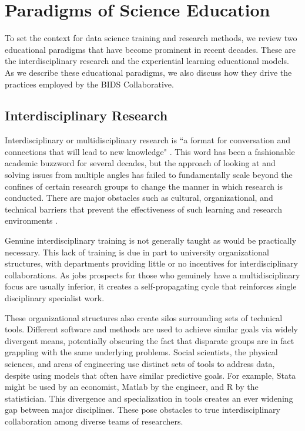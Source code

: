 \documentclass[12pt]{article}
\begin{document}
\section{Paradigms of Science Education}

To set the context for data science training and research methods, we review two educational paradigms that have become prominent in recent decades. These are the interdisciplinary research and the experiential learning educational models.  As we describe these educational paradigms, we also discuss how they drive the practices employed by the BIDS Collaborative.

\subsection{Interdisciplinary Research}

Interdisciplinary or multidisciplinary research is ``a format for conversation and connections that will lead to new knowledge" \citep{repko2008interdisciplinary}. This word has been a fashionable academic buzzword for several decades, but the approach of looking at and solving issues from multiple angles has failed to fundamentally scale beyond the confines of certain research groups to change the manner in which research is conducted. There are major obstacles such as cultural, organizational, and technical barriers that prevent the effectiveness of such learning and research environments \citep{eisenberg2000bridging}.

Genuine interdisciplinary training is not generally taught as would be practically necessary.  This lack of training is due in part to university organizational structures, with departments providing little or no incentives for interdisciplinary collaborations. As jobs prospects for those who genuinely have a multidisciplinary focus are usually inferior, it creates a self-propagating cycle that reinforces single disciplinary specialist work. 

These organizational structures also create silos surrounding sets of technical tools.  Different software and methods are used to achieve similar goals via widely divergent means, potentially obscuring the fact that disparate groups are in fact grappling with the same underlying problems. Social scientists, the physical sciences, and areas of engineering use distinct sets of tools to address data, despite using models that often have similar predictive goals. For example, Stata \citep{stata2005stata} might be used by an economist, Matlab \citep{incorporation2005matlab} by the engineer, and R \citep{RCoreTeam2014} by the statistician. This divergence and specialization in tools creates an ever widening gap between major disciplines.  These pose obstacles to true interdisciplinary collaboration among diverse teams of researchers.
\end{document}
